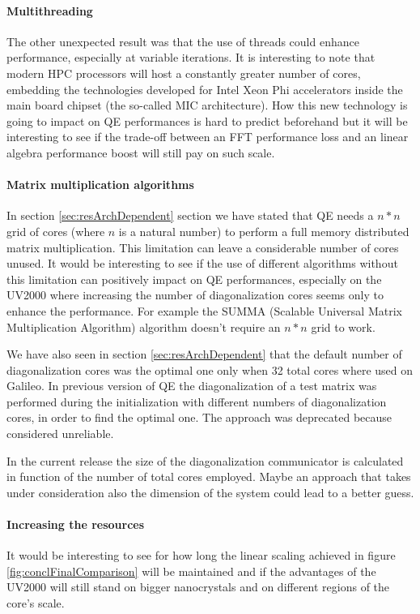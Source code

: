 \documentclass[a4paper,12pt]{article}
\begin{document}
\paragraph{Multithreading} The other unexpected result was that the use of threads could enhance performance, especially at variable iterations. 
It is interesting to note that modern HPC processors will host a constantly greater number of cores, embedding the technologies developed for Intel Xeon Phi accelerators inside the main board chipset (the so-called MIC architecture).
How this new technology is going to impact on QE performances is hard to predict beforehand but it will be interesting to see if the trade-off between an FFT performance loss and an linear algebra performance boost will still pay on such scale.


\paragraph{Matrix multiplication algorithms} In section \ref{sec:resArchDependent} section we have stated that QE needs a $n*n$ grid of cores (where $n$ is a natural number) to perform a full memory distributed matrix multiplication.
This limitation can leave a considerable number of cores unused.
It would be interesting to see if the use of different algorithms without this limitation can positively impact on QE performances, especially on the UV2000 where increasing the number of diagonalization cores seems only to enhance the performance. 
For example the SUMMA (Scalable Universal Matrix Multiplication Algorithm) algorithm doesn't require an $n*n$ grid to work.

We have also seen in section \ref{sec:resArchDependent} that the default number of diagonalization cores was the optimal one only when 32 total cores where used on Galileo. 
In previous version of QE the diagonalization of a test matrix was performed during the initialization with different numbers of diagonalization cores, in order to find the optimal one.
The approach was deprecated because considered unreliable.

In the current release the size of the diagonalization communicator is calculated in function of the number of total cores employed. 
Maybe an approach that takes under consideration also the dimension of the system could lead to a better guess.


\paragraph{Increasing the resources} It would be interesting to see for how long the linear scaling achieved in figure \ref{fig:conclFinalComparison} will be maintained and if the advantages of the UV2000 will still stand on bigger nanocrystals and on different regions of the core's scale.
\end{document}
